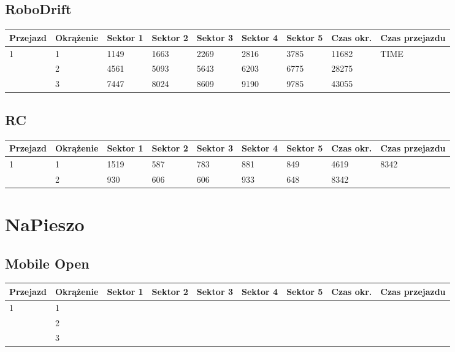\documentclass[11pt]{article}
\begin{document}
\subsection{RoboDrift}
\begin{table}[h]
\begin{tabular}{|l|l|l|l|l|l|l|l|l|}
\hline
   Przejazd        & Okrążenie & Sektor 1 & Sektor 2 & Sektor 3 & Sektor 4 & Sektor 5 & Czas okr. & Czas przejazdu    \\ \hline
\multirow{3}{*}{1}& 1 &1149& 1663& 2269& 2816& 3785& 11682& \multirow{3}{*}{TIME} \\ \cline{2-8}
& 2& 4561& 5093& 5643& 6203& 6775& 28275& \\ \cline{2-8}
& 3& 7447& 8024& 8609& 9190& 9785& 43055& \\ \hline
\end{tabular}
\end{table}
\subsection{RC}
\begin{table}[h]
\begin{tabular}{|l|l|l|l|l|l|l|l|l|}
\hline
 Przejazd        & Okrążenie & Sektor 1 & Sektor 2 & Sektor 3 & Sektor 4 & Sektor 5 & Czas okr. & Czas przejazdu    \\ \hline
\multirow{2}{*}{1}& 1 &1519& 587& 783& 881& 849& 4619& \multirow{2}{*}{8342} \\ \cline{2-8}
& 2& 930& 606& 606& 933& 648& 8342& \\ \hline
\end{tabular}
\end{table}
\pagebreak
\section{NaPieszo}
\subsection{Mobile Open}
\begin{table}[h]
\begin{tabular}{|l|l|l|l|l|l|l|l|l|}
\hline
   Przejazd        & Okrążenie & Sektor 1 & Sektor 2 & Sektor 3 & Sektor 4 & Sektor 5 & Czas okr. & Czas przejazdu    \\ \hline
\multirow{3}{*}{1} & 1         &          &          &          &          &          &           & \multirow{3}{*}{} \\ \cline{2-8}
                         & 2         &          &          &          &          &          &           &                    \\ \cline{2-8}
                         & 3         &          &          &          &          &          &           &                    \\ \hline
\end{tabular}
\end{table}
\end{document}
